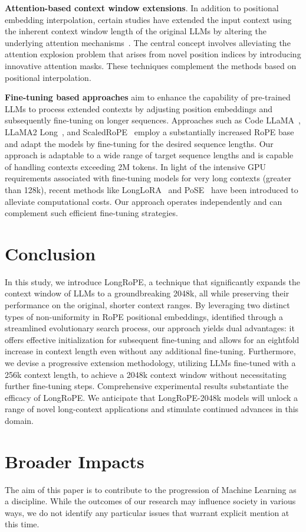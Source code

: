 \textbf{Attention-based context window extensions}. In addition to positional embedding interpolation, certain studies have extended the input context using the inherent context window length of the original LLMs by altering the underlying attention mechanisms~\cite{han2023lminfinite, streamingllm,parallelwindow}. The central concept involves alleviating the attention explosion problem that arises from novel position indices by introducing innovative attention masks. These techniques complement the methods based on positional interpolation.

\textbf{Fine-tuning based approaches} aim to enhance the capability of pre-trained LLMs to process extended contexts by adjusting position embeddings and subsequently fine-tuning on longer sequences. Approaches such as Code LLaMA~\cite{codellama}, LLaMA2 Long~\cite{xiong2023effective}, and ScaledRoPE~\cite{liu2023scaling} employ a substantially increased RoPE base and adapt the models by fine-tuning for the desired sequence lengths. Our approach is adaptable to a wide range of target sequence lengths and is capable of handling contexts exceeding 2M tokens. In light of the intensive GPU requirements associated with fine-tuning models for very long contexts (greater than 128k), recent methods like LongLoRA~\cite{longlora} and PoSE~\cite{zhu2023pose} have been introduced to alleviate computational costs. Our approach operates independently and can complement such efficient fine-tuning strategies.

\section{Conclusion}

In this study, we introduce LongRoPE, a technique that significantly expands the context window of LLMs to a groundbreaking 2048k, all while preserving their performance on the original, shorter context ranges. By leveraging two distinct types of non-uniformity in RoPE positional embeddings, identified through a streamlined evolutionary search process, our approach yields dual advantages: it offers effective initialization for subsequent fine-tuning and allows for an eightfold increase in context length even without any additional fine-tuning. Furthermore, we devise a progressive extension methodology, utilizing LLMs fine-tuned with a 256k context length, to achieve a 2048k context window without necessitating further fine-tuning steps. Comprehensive experimental results substantiate the efficacy of LongRoPE. We anticipate that LongRoPE-2048k models will unlock a range of novel long-context applications and stimulate continued advances in this domain.

\section*{Broader Impacts} The aim of this paper is to contribute to the progression of Machine Learning as a discipline. While the outcomes of our research may influence society in various ways, we do not identify any particular issues that warrant explicit mention at this time.

	\balance

